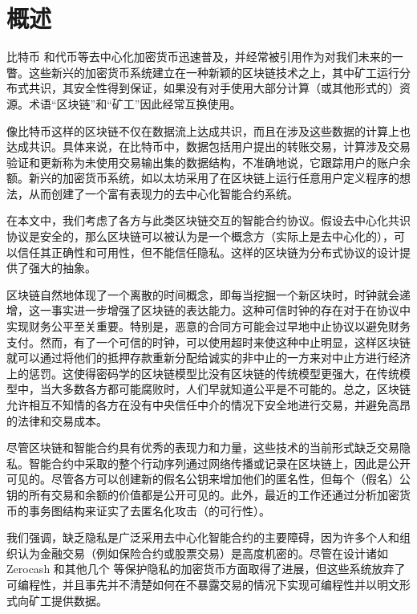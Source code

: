 \documentclass{xduugtrans}
\begin{document}
\frontmatter
\mainmatter
\chapter{概述}
比特币\cite{ref48} 和代币\cite{ref20}等去中心化加密货币迅速普及，并经常被引用作为对我们未来的一瞥\cite{ref5}。这些新兴的加密货币系统建立在一种新颖的区块链技术之上，其中矿工运行分布式共识，其安全性得到保证，如果没有对手使用大部分计算（或其他形式的）资源。术语“区块链”和“矿工”因此经常互换使用。

像比特币这样的区块链不仅在数据流上达成共识，而且在涉及这些数据的计算上也达成共识。具体来说，在比特币中，数据包括用户提出的转账交易，计算涉及交易验证和更新称为未使用交易输出集的数据结构，不准确地说，它跟踪用户的账户余额。新兴的加密货币系统，如以太坊\cite{ref57}采用了在区块链上运行任意用户定义程序的想法，从而创建了一个富有表现力的去中心化智能合约系统。

在本文中，我们考虑了各方与此类区块链交互的智能合约协议。假设去中心化共识协议是安全的，那么区块链可以被认为是一个概念方（实际上是去中心化的），可以信任其正确性和可用性，但不能信任隐私。这样的区块链为分布式协议的设计提供了强大的抽象。

区块链自然地体现了一个离散的时间概念，即每当挖掘一个新区块时，时钟就会递增，这一事实进一步增强了区块链的表达能力。这种可信时钟的存在对于在协议中实现财务公平至关重要。特别是，恶意的合同方可能会过早地中止协议以避免财务支付。然而，有了一个可信的时钟，可以使用超时来使这种中止明显，这样区块链就可以通过将他们的抵押存款重新分配给诚实的非中止的一方来对中止方进行经济上的惩罚。这使得密码学的区块链模型比没有区块链的传统模型更强大，在传统模型中，当大多数各方都可能腐败时，人们早就知道公平是不可能的\cite{ref8}\cite{ref17}\cite{ref24}。总之，区块链允许相互不知情的各方在没有中央信任中介的情况下安全地进行交易，并避免高昂的法律和交易成本。

尽管区块链和智能合约具有优秀的表现力和力量，这些技术的当前形式缺乏交易隐私。智能合约中采取的整个行动序列通过网络传播或记录在区块链上，因此是公开可见的。尽管各方可以创建新的假名公钥来增加他们的匿名性，但每个（假名）公钥的所有交易和余额的价值都是公开可见的。此外，最近的工作还通过分析加密货币的事务图结构来证实了去匿名化攻击（的可行性）\cite{ref42}\cite{ref52}。

我们强调，缺乏隐私是广泛采用去中心化智能合约的主要障碍，因为许多个人和组织认为金融交易（例如保险合约或股票交易）是高度机密的。尽管在设计诸如 Zerocash \cite{ref11} 和其他几个 \cite{ref26}\cite{ref43}\cite{ref54} 等保护隐私的加密货币方面取得了进展，但这些系统放弃了可编程性，并且事先并不清楚如何在不暴露交易的情况下实现可编程性并以明文形式向矿工提供数据。
\end{document}
